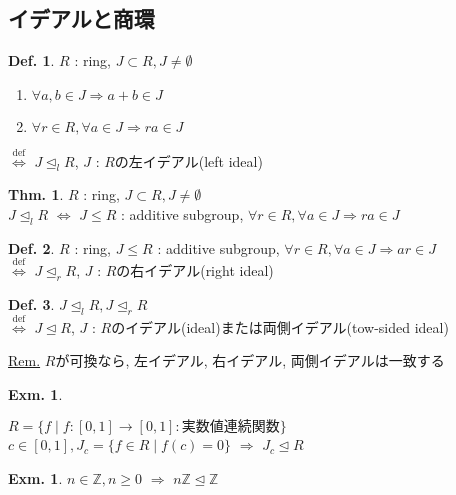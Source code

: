 \documentclass[uplatex,dvipdfmx,9pt]{beamer}
\newcommand{\defarrow}{\overset{\mathrm{def}}{\Leftrightarrow}}
\newcommand{\lideal}{\trianglelefteq_l}
\newcommand{\rideal}{\trianglelefteq_r}
\newcommand{\ideal}{\trianglelefteq}
\newcommand{\Z}{\mathbb{Z}}
\newcommand{\sscount}{\textsection \thesubsection}
\newcounter{textExmCount}
\theoremstyle{definition} %
\newtheorem{defn}{Def.}[subsection] %
\newtheorem{thm}{Thm.}[subsection] %
\theoremstyle{example}
\newtheorem{exmText}[textExmCount]{Exm.}
\begin{document}
\subsection{\sscount イデアルと商環}
\setcounter{textExmCount}{0}

\begin{frame}

  \begin{defn}
    $R$ : ring, $J \subset R, J \neq \emptyset$
    \begin{enumerate}
      \item $\forall a, b \in J \Rightarrow a + b \in J$
      \item $\forall r \in R, \forall a \in J \Rightarrow ra \in J$
    \end{enumerate}
    $\defarrow$ $J \lideal R$, $J$ : $R$の\alert{左イデアル(left ideal)}
  \end{defn}

  \begin{thm}
    $R$ : ring, $J \subset R, J \neq \emptyset$ \\
    $J \lideal R$ $\Leftrightarrow$ $J \le R$ : additive subgroup, $\forall r \in R, \forall a \in J \Rightarrow ra \in J$
  \end{thm}

  \begin{defn}
    $R$ : ring, $J \le R$ : additive subgroup, $\forall r \in R, \forall a \in J \Rightarrow ar \in J$ \\
    $\defarrow$ $J \rideal R$, $J$ : $R$の\alert{右イデアル(right ideal)}
  \end{defn}

\end{frame}

\begin{frame}

  \begin{defn}
    $J \lideal R, J \rideal R$ \\
    $\defarrow$ $J \ideal R$, $J$ : $R$の\alert{イデアル(ideal)}または\alert{両側イデアル(tow-sided ideal)}
  \end{defn}
  \underline{Rem.} $R$が可換なら, 左イデアル, 右イデアル, 両側イデアルは一致する

  \begin{exmText}
    \hypertarget{exmText3-1}{}
    $R = \{f \mid f\colon [0,1] \to [0,1] : \text{実数値連続関数}\}$ \\
    $c \in [0,1], J_c = \{f \in R \mid f(c) = 0\}$ $\Rightarrow$ $J_c \ideal R$
  \end{exmText}

  \begin{exmText}
    $n \in \Z, n \ge 0$ $\Rightarrow$ $n\Z \ideal \Z$
  \end{exmText}

\end{frame}
\end{document}
